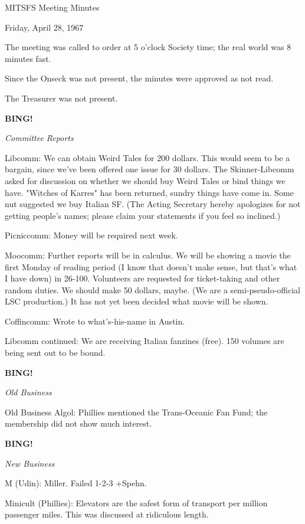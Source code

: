 \documentclass[12pt]{article}
\newcommand{\bing}{{\bf BING!} }
\newcommand{\goto}[1]{\bing \vskip 12pt \centerline{{\em{#1}}}}
\begin{document}
\begin{center}

MITSFS Meeting Minutes 

Friday, April 28, 1967

\end{center}
 
\vspace{12pt}

\setlength{\parskip}{6pt}

\noindent
The meeting was called to order at 5 o'clock Society time; the real world was 8 minutes fast.

Since the Onseck was not present, the minutes were approved as not read.

The Treasurer was not present.

\goto{Committee Reports}

Libcomm: We can obtain Weird Tales for 200 dollars. This would seem to be a bargain, since we've been offered one issue for 30 dollars. The Skinner-Libcomm asked for discussion on whether we should buy Weird Tales or bind things we have. "Witches of Karres" has been returned, sundry things have come in. Some nut suggested we buy Italian SF. (The Acting Secretary hereby apologizes for not getting people's names; please claim your statements if you feel so inclined.)

Picniccomm: Money will be required next week.

Moocomm: Further reports will be in calculus. We will be showing a movie the first Monday of reading period (I know that doesn't make sense, but that's what I have down) in 26-100. Volunteers are requested for ticket-taking and other random duties. We should make 50 dollars, maybe. (We are a semi-pseudo-official LSC production.) It has not yet been decided what movie will be shown.

Coffincomm: Wrote to what's-his-name in Austin.

Libcomm continued: We are receiving Italian fanzines (free). 150 volumes are being sent out to be bound.

\goto{Old Business}

Old Business Algol: Phillies mentioned the Trans-Oceanic Fan Fund; the membership did not show much interest.

\goto{New Business}

M (Udin): Miller. Failed 1-2-3 +Spehn.

Minicult (Phillies): Elevators are the safest form of transport per million passenger miles. This was discussed at ridiculous length.
\end{document}
